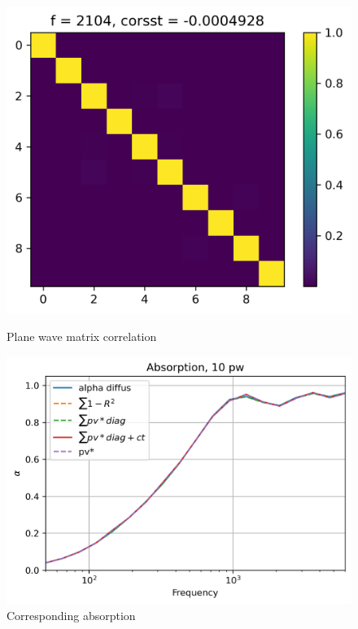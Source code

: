 \documentclass[
a4paper, %
12pt, %
]{SourcesTemplate/TemplateReport}
\begin{document}
	\begin{figure}[h!]
	\captionsetup{width=0.45\textwidth}
	\begin{minipage}[c]{.45\linewidth}
		\begin{center}
	\includegraphics[width=0.9\linewidth]{images/cross1}
			\caption*{Plane wave matrix correlation}
		\end{center}
	\end{minipage}
	\hfill
	\begin{minipage}[c]{.45\linewidth}
		\begin{center}
	\includegraphics[width=0.9\linewidth]{images/cross2}
			\caption*{Corresponding absorption}
		\end{center}
	\end{minipage}
\end{figure}	
	
\end{document}
